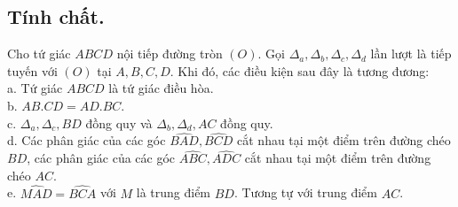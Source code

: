\documentclass[12pt,a4paper]{article}
\begin{document}
\subsection{Tính chất.} 
Cho tứ giác \(ABCD\) nội tiếp đường tròn \(\left( O \right)\). Gọi \({\Delta _a},{\Delta _b},{\Delta _c},{\Delta _d}\) lần lượt là tiếp tuyến với \(\left( O \right)\) tại \(A, B, C, D\). Khi đó, các điều kiện sau đây là tương đương:\\
a. Tứ giác \(ABCD\) là tứ giác điều hòa.\\
b. \(AB.CD = AD. BC\).\\
c. \({\Delta _a}, {\Delta_c}, BD\) đồng quy và \({\Delta_b}, {\Delta_d}, AC\) đồng quy.\\
d. Các phân giác của các góc \(\widehat {BAD},\widehat {BCD}\) cắt nhau tại một điểm trên đường chéo \(BD\), các phân giác của các góc \(\widehat {ABC},\widehat {ADC}\) cắt nhau tại một điểm trên đường chéo \(AC\).\\
e. \(\widehat {MAD} = \widehat {BCA}\) với \(M\) là trung điểm \(BD\). Tương tự với trung điểm \(AC\).
\end{document}
